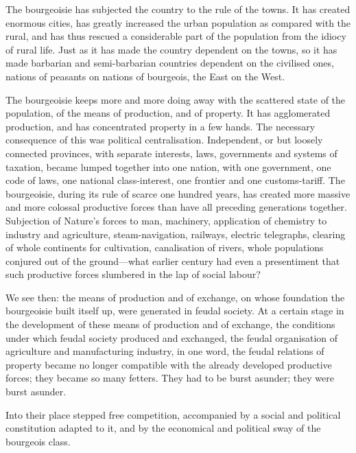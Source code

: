 \documentclass[, oneside]{article}   	%
\begin{document}
The bourgeoisie has subjected the country to the rule of the towns. It has created enormous cities, has greatly increased the urban population as compared with the rural, and has thus rescued a considerable part of the population from the idiocy of rural life. Just as it has made the country dependent on the towns, so it has made barbarian and semi-barbarian countries dependent on the civilised ones, nations of peasants on nations of bourgeois, the East on the West.

The bourgeoisie keeps more and more doing away with the scattered state of the population, of the means of production, and of property. It has agglomerated production, and has concentrated property in a few hands. The necessary consequence of this was political centralisation. Independent, or but loosely connected provinces, with separate interests, laws, governments and systems of taxation, became lumped together into one nation, with one government, one code of laws, one national class-interest, one frontier and one customs-tariff. The bourgeoisie, during its rule of scarce one hundred years, has created more massive and more colossal productive forces than have all preceding generations together. Subjection of Nature's forces to man, machinery, application of chemistry to industry and agriculture, steam-navigation, railways, electric telegraphs, clearing of whole continents for cultivation, canalisation of rivers, whole populations conjured out of the ground—what earlier century had even a presentiment that such productive forces slumbered in the lap of social labour?

We see then: the means of production and of exchange, on whose foundation the bourgeoisie built itself up, were generated in feudal society. At a certain stage in the development of these means of production and of exchange, the conditions under which feudal society produced and exchanged, the feudal organisation of agriculture and manufacturing industry, in one word, the feudal relations of property became no longer compatible with the already developed productive forces; they became so many fetters. They had to be burst asunder; they were burst asunder.

Into their place stepped free competition, accompanied by a social and political constitution adapted to it, and by the economical and political sway of the bourgeois class.
\end{document}
